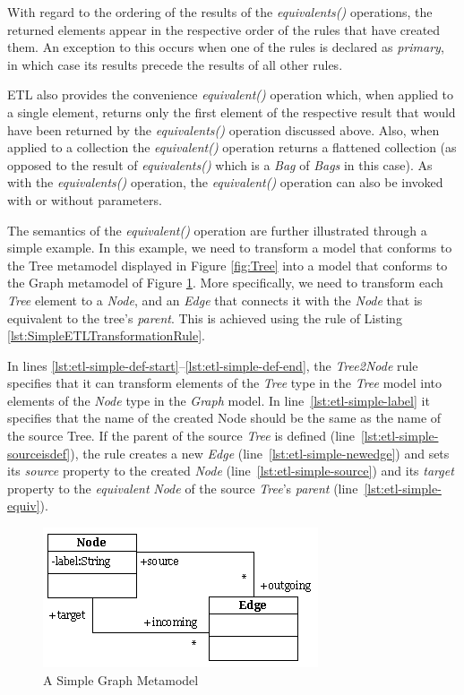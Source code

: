 With regard to the ordering of the results of the \emph{equivalents()} operations, the returned elements appear in the respective order of the rules that have created them. An exception to this occurs when one of the rules is declared as \emph{primary}, in which case its results precede the results of all other rules.

ETL also provides the convenience \emph{equivalent()} operation which, when applied to a single element, returns only the first element of the respective result that would have been returned by the \emph{equivalents()} operation discussed above. Also, when applied to a collection the \emph{equivalent()} operation returns a flattened collection (as opposed to the result of \emph{equivalents()} which is a \emph{Bag} of \emph{Bags} in this case). As with the \emph{equivalents()} operation, the \emph{equivalent()} operation can also be invoked with or without parameters.

The semantics of the \emph{equivalent()} operation are further illustrated through a simple example. In this example, we need to transform a model that conforms to the Tree metamodel displayed in Figure \ref{fig:Tree} into a model that conforms to the Graph metamodel of Figure \ref{fig:Graph}. More specifically, we need to transform each \emph{Tree} element to a \emph{Node}, and an \emph{Edge} that connects it with the \emph{Node} that is equivalent to the tree's \emph{parent}. This is achieved using the rule of Listing \ref{lst:SimpleETLTransformationRule}. 

In lines \ref{lst:etl-simple-def-start}--\ref{lst:etl-simple-def-end}, the \emph{Tree2Node} rule specifies that it can transform elements of the \emph{Tree} type in the \emph{Tree} model into elements of the \emph{Node} type in the \emph{Graph} model. In line~\ref{lst:etl-simple-label} it specifies that the name of the created Node should be the same as the name of the source Tree. If the parent of the source \emph{Tree} is defined (line~\ref{lst:etl-simple-sourceisdef}), the rule creates a new \emph{Edge} (line~\ref{lst:etl-simple-newedge}) and sets its \emph{source} property to the created \emph{Node} (line~\ref{lst:etl-simple-source}) and its \emph{target} property to the \emph{equivalent} \emph{Node} of the source \emph{Tree}'s \emph{parent} (line~\ref{lst:etl-simple-equiv}).

\begin{figure}
	\centering
		\includegraphics{images/Graph.png}
	\caption{A Simple Graph Metamodel}
	\label{fig:Graph}
\end{figure}

